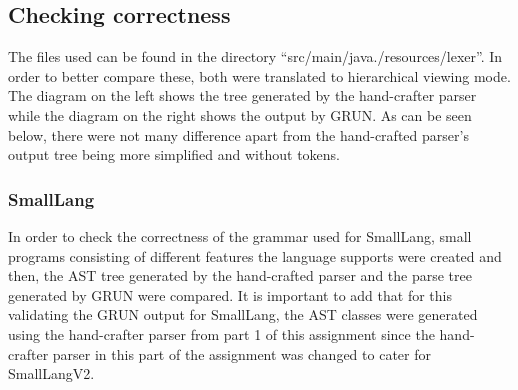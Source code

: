 \documentclass{article}
\newcommand{\quotes}[1]{``#1''}
\begin{document}
					
		\subsection{Checking correctness}
		The files used can be found in the directory \quotes{src/main/java./resources/lexer}. In order to better compare these, both were translated to hierarchical viewing mode. The diagram on the left shows the tree generated by the hand-crafter parser while the diagram on the right shows the output by GRUN.  As can be seen below, there were not many difference apart from the hand-crafted parser's output tree being more simplified and without tokens.
		
		\subsubsection{SmallLang}
		
		In order to check the correctness of the grammar used for SmallLang, small programs consisting of different features the language supports were created and then, the AST tree generated by the hand-crafted parser and the parse tree generated by GRUN were compared. It is important to add that for this validating the GRUN output for SmallLang, the AST classes were generated using the hand-crafter parser from part 1 of this assignment since the hand-crafter parser in this part of the assignment was changed to cater for SmallLangV2.
		
\end{document}
